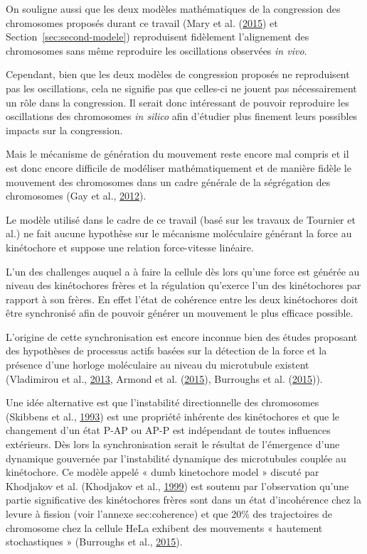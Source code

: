 \documentclass[12pt,a4paper,twoside,openright]{book}
\begin{document}
On souligne aussi que les deux modèles mathématiques de la congression
des chromosomes proposés durant ce travail (Mary et al.
(\hyperref[ref-Mary2015]{2015}) et Section~\ref{sec:second-modele})
reproduisent fidèlement l'alignement des chromosomes sans même
reproduire les oscillations observées \emph{in vivo}.

Cependant, bien que les deux modèles de congression proposés ne
reproduisent pas les oscillations, cela ne signifie pas que celles-ci ne
jouent pas nécessairement un rôle dans la congression. Il serait donc
intéressant de pouvoir reproduire les oscillations des chromosomes
\emph{in silico} afin d'étudier plus finement leurs possibles impacts
sur la congression.

Mais le mécanisme de génération du mouvement reste encore mal compris et
il est donc encore difficile de modéliser mathématiquement et de manière
fidèle le mouvement des chromosomes dans un cadre générale de la
ségrégation des chromosomes (Gay et al., \hyperref[ref-Gay2012a]{2012}).

Le modèle utilisé dans le cadre de ce travail (basé sur les travaux de
Tournier et al.) ne fait aucune hypothèse sur le mécanisme moléculaire
générant la force au kinétochore et suppose une relation force-vitesse
linéaire.

L'un des challenges auquel a à faire la cellule dès lors qu'une force
est générée au niveau des kinétochores frères et la régulation qu'exerce
l'un des kinétochores par rapport à son frères. En effet l'état de
cohérence entre les deux kinétochores doit être synchronisé afin de
pouvoir générer un mouvement le plus efficace possible.

L'origine de cette synchronisation est encore inconnue bien des études
proposant des hypothèses de processus actifs basées sur la détection de
la force et la présence d'une horloge moléculaire au niveau du
microtubule existent (Vladimirou et al.,
\hyperref[ref-Vladimirou2013]{2013}, Armond et al.
(\hyperref[ref-Armond2015]{2015}), Burroughs et al.
(\hyperref[ref-Burroughs2015]{2015})).

Une idée alternative est que l'instabilité directionnelle des
chromosomes (Skibbens et al., \hyperref[ref-Skibbens1993]{1993}) est une
propriété inhérente des kinétochores et que le changement d'un état P-AP
ou AP-P est indépendant de toutes influences extérieurs. Dès lors la
synchronisation serait le résultat de l'émergence d'une dynamique
gouvernée par l'instabilité dynamique des microtubules couplée au
kinétochore. Ce modèle appelé « dumb kinetochore model » discuté par
Khodjakov et al. (Khodjakov et al., \hyperref[ref-Khodjakov1999]{1999})
est soutenu par l'observation qu'une partie significative des
kinétochores frères sont dans un état d'incohérence chez la levure à
fission (voir l'annexe sec:coherence) et que 20\% des trajectoires de
chromosome chez la cellule HeLa exhibent des mouvements « hautement
stochastiques » (Burroughs et al., \hyperref[ref-Burroughs2015]{2015}).
\end{document}
